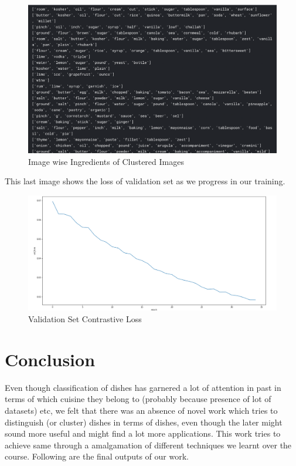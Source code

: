 \documentclass{article}
\begin{document}
\begin{figure}[H]
\includegraphics[width=5in]{Screen Shot 2021-12-12 at 5.38.38 PM}
\caption{Image wise Ingredients of Clustered Images}
\end{figure}
This last image shows the loss of validation set as we progress in our training.
\begin{figure}[H]
\includegraphics[width=5in]{Screenshot from 2021-12-12 18-41-44.png}
\caption{Validation Set Contrastive Loss}
\end{figure}

\section{Conclusion}
Even though classification of dishes has garnered a lot of attention in past in terms of which cuisine they belong to (probably because presence of lot of datasets) etc, we felt that there was an absence of novel work which tries to distinguish (or cluster) dishes in terms of dishes, even though the later might sound more useful and might find a lot more applications. This work tries to achieve same through a amalgamation of different techniques we learnt over the course.
Following are the final outputs of our work.
\end{document}
